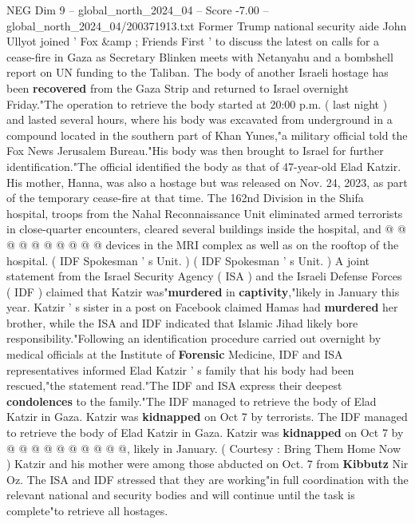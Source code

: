 \begin{textsample}{NEG Dim 9 – global\_north\_2024\_04 – Score -7.00 – global\_north\_2024\_04/200371913.txt}  \label{ex:f9_neg_267}
Former Trump national security aide John Ullyot joined ' Fox \&amp ; Friends First ' to discuss the latest on calls for a cease-fire in Gaza as Secretary Blinken meets with Netanyahu and a bombshell report on UN funding to the Taliban.
The body of another Israeli hostage has been \textbf{recovered} from the Gaza Strip and returned to Israel overnight Friday."The operation to retrieve the body started at 20:00 p.m. ( last night ) and lasted several hours, where his body was excavated from underground in a compound located in the southern part of Khan Yunes,"a military official told the Fox News Jerusalem Bureau."His body was then brought to Israel for further identification."The official identified the body as that of 47-year-old Elad Katzir.
His mother, Hanna, was also a hostage but was released on Nov. 24, 2023, as part of the temporary cease-fire at that time.
The 162nd Division in the Shifa hospital, troops from the Nahal Reconnaissance Unit eliminated armed terrorists in close-quarter encounters, cleared several buildings inside the hospital, and @ @ @ @ @ @ @ @ @ @ devices in the MRI complex as well as on the rooftop of the hospital. ( IDF Spokesman ' s Unit. ) ( IDF Spokesman ' s Unit. ) A joint statement from the Israel Security Agency ( ISA ) and the Israeli Defense Forces ( IDF ) claimed that Katzir was"\textbf{murdered} in \textbf{captivity},"likely in January this year.
Katzir ' s sister in a post on Facebook claimed Hamas had \textbf{murdered} her brother, while the ISA and IDF indicated that Islamic Jihad likely bore responsibility."Following an identification procedure carried out overnight by medical officials at the Institute of \textbf{Forensic} Medicine, IDF and ISA representatives informed Elad Katzir ' s family that his body had been rescued,"the statement read."The IDF and ISA express their deepest \textbf{condolences} to the family."The IDF managed to retrieve the body of Elad Katzir in Gaza.
Katzir was \textbf{kidnapped} on Oct 7 by terrorists.
The IDF managed to retrieve the body of Elad Katzir in Gaza.
Katzir was \textbf{kidnapped} on Oct 7 by @ @ @ @ @ @ @ @ @ @, likely in January. ( Courtesy : Bring Them Home Now ) Katzir and his mother were among those abducted on Oct. 7 from \textbf{Kibbutz} Nir Oz.
The ISA and IDF stressed that they are working"in full coordination with the relevant national and security bodies and will continue until the task is complete"to retrieve all hostages.

\end{textsample}
